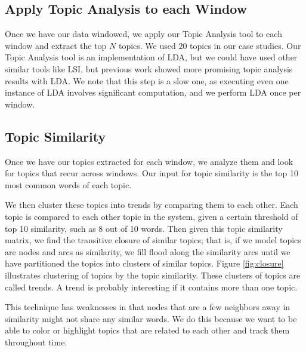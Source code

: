 \documentclass[times, 10pt,twocolumn]{article}
\newcommand{\shrinkit}{\vspace*{-.3em}}
\begin{document}
\shrinkit
\subsection{Apply Topic Analysis to each Window}
\shrinkit

Once we have our data windowed, we apply our Topic Analysis tool to
each window and extract the top $N$ topics. We used $20$
topics in our case studies. Our Topic Analysis tool is an
implementation of LDA, but we could have used other similar tools like
LSI, but previous work showed more promising topic analysis results
with LDA.  We note that this step is a slow one, as executing even one
instance of LDA involves significant computation, and we perform LDA
once per window.





\shrinkit
\subsection{Topic Similarity}
\shrinkit


Once we have our topics extracted for each window, we analyze them and
look for topics that recur across windows. Our input for topic
similarity is the top 10 most common words of each topic.

We then cluster these topics into trends by comparing them to each
other.  Each topic is compared to each other topic in the system,
given a certain threshold of top 10 similarity, such as 8 out of 10
words. Then given this topic similarity matrix, we find the transitive
closure of similar topics; that is, if we model topics are nodes and
arcs as similarity, we fill flood along the similarity arcs until we
have partitioned the topics into clusters of similar topics. Figure
\ref{fig:closure} illustrates clustering of topics by the
topic similarity. These clusters of topics are called trends. A trend
is probably interesting if it contains more than one topic.

This technique has weaknesses in that nodes that are a few neighbors
away in similarity might not share any similar words.  We do this
because we want to be able to color or highlight topics that are
related to each other and track them throughout time.
\end{document}
